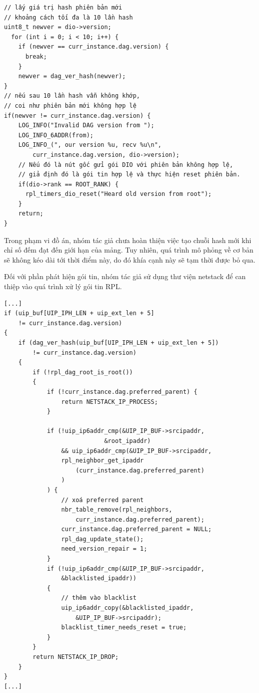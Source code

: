 \begin{verbatim}
// lấy giá trị hash phiên bản mới
// khoảng cách tối đa là 10 lần hash
uint8_t newver = dio->version;
  for (int i = 0; i < 10; i++) {
    if (newver == curr_instance.dag.version) {
      break;
    }
    newver = dag_ver_hash(newver);
}
// nếu sau 10 lần hash vẫn không khớp,
// coi như phiên bản mới không hợp lệ
if(newver != curr_instance.dag.version) {
    LOG_INFO("Invalid DAG version from ");
    LOG_INFO_6ADDR(from);
    LOG_INFO_(", our version %u, recv %u\n", 
        curr_instance.dag.version, dio->version);
    // Nếu đó là nút gốc gửi gói DIO với phiên bản không hợp lệ,
    // giả định đó là gói tin hợp lệ và thực hiện reset phiên bản.
    if(dio->rank == ROOT_RANK) {
      rpl_timers_dio_reset("Heard old version from root");
    }
    return;
}
\end{verbatim}

Trong phạm vi đồ án, nhóm tác giả chưa hoàn thiện việc tạo chuỗi hash mới khi chỉ số đếm đạt đến giới hạn của mảng. Tuy nhiên, quá trình mô phỏng về cơ bản sẽ không kéo dài tới thời điểm này, do đó khía cạnh này sẽ tạm thời được bỏ qua.

Đối với phần phát hiện gói tin, nhóm tác giả sử dụng thư viện netstack để can thiệp vào quá trình xử lý gói tin RPL.

\begin{verbatim}
[...]
if (uip_buf[UIP_IPH_LEN + uip_ext_len + 5] 
    != curr_instance.dag.version)
{
    if (dag_ver_hash(uip_buf[UIP_IPH_LEN + uip_ext_len + 5])
        != curr_instance.dag.version)
    {
        if (!rpl_dag_root_is_root())
        {
            if (!curr_instance.dag.preferred_parent) {
                return NETSTACK_IP_PROCESS;
            }

            if (!uip_ip6addr_cmp(&UIP_IP_BUF->srcipaddr, 
                            &root_ipaddr)
                && uip_ip6addr_cmp(&UIP_IP_BUF->srcipaddr,
                rpl_neighbor_get_ipaddr
                    (curr_instance.dag.preferred_parent)
                )
            ) {
                // xoá preferred parent
                nbr_table_remove(rpl_neighbors, 
                    curr_instance.dag.preferred_parent);
                curr_instance.dag.preferred_parent = NULL;
                rpl_dag_update_state();
                need_version_repair = 1;
            }
            if (!uip_ip6addr_cmp(&UIP_IP_BUF->srcipaddr,
                &blacklisted_ipaddr))
            {
                // thêm vào blacklist
                uip_ip6addr_copy(&blacklisted_ipaddr, 
                    &UIP_IP_BUF->srcipaddr);
                blacklist_timer_needs_reset = true;
            }
        }
        return NETSTACK_IP_DROP;
    }
}
[...]
\end{verbatim}

